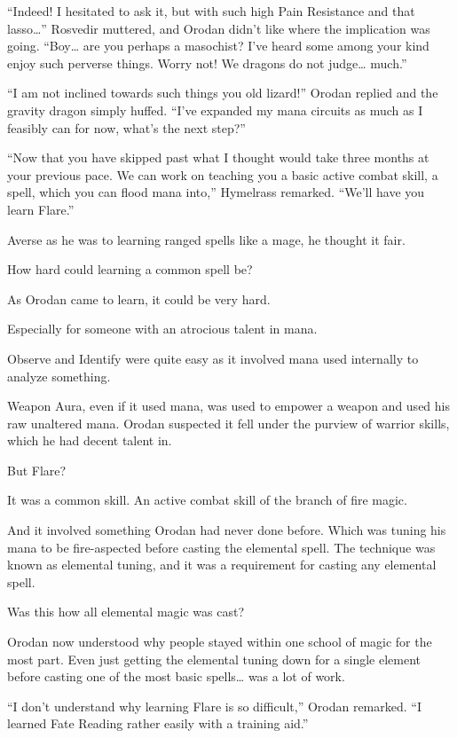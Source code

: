 \documentclass[a4paper,10pt]{book}
\begin{document}
“Indeed! I hesitated to ask it, but with such high Pain Resistance and that lasso…” Rosvedir muttered, and Orodan didn’t like where the implication was going. “Boy… are you perhaps a masochist? I’ve heard some among your kind enjoy such perverse things. Worry not! We dragons do not judge… much.”\par
“I am not inclined towards such things you old lizard!” Orodan replied and the gravity dragon simply huffed. “I’ve expanded my mana circuits as much as I feasibly can for now, what’s the next step?”\par
“Now that you have skipped past what I thought would take three months at your previous pace. We can work on teaching you a basic active combat skill, a spell, which you can flood mana into,” Hymelrass remarked. “We’ll have you learn Flare.”\par
Averse as he was to learning ranged spells like a mage, he thought it fair.\par
How hard could learning a common spell be?\par
\par
As Orodan came to learn, it could be very hard.\par
Especially for someone with an atrocious talent in mana.\par
Observe and Identify were quite easy as it involved mana used internally to analyze something.\par
Weapon Aura, even if it used mana, was used to empower a weapon and used his raw unaltered mana. Orodan suspected it fell under the purview of warrior skills, which he had decent talent in.\par
But Flare?\par
It was a common skill. An active combat skill of the branch of fire magic.\par
And it involved something Orodan had never done before. Which was tuning his mana to be fire-aspected before casting the elemental spell. The technique was known as elemental tuning, and it was a requirement for casting any elemental spell.\par
Was this how all elemental magic was cast?\par
Orodan now understood why people stayed within one school of magic for the most part. Even just getting the elemental tuning down for a single element before casting one of the most basic spells… was a lot of work.\par
“I don’t understand why learning Flare is so difficult,” Orodan remarked. “I learned Fate Reading rather easily with a training aid.”\par
\end{document}

